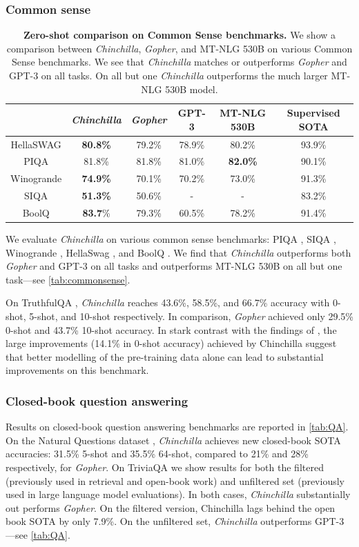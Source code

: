 \documentclass[11pt, a4paper, logo, copyright, nonumbering]{deepmind}
\newcommand{\gopher}{\textit{Gopher}\xspace}
\newcommand{\chinchilla}{\textit{Chinchilla}\xspace}
\newcommand{\mtnlg}{MT-NLG 530B\xspace}
\begin{document}
\subsubsection{Common sense}
\begin{table}[hb]
    \centering
    \begin{tabular}{cccccc}
    \toprule
    & \chinchilla & \gopher & GPT-3 & \mtnlg & Supervised SOTA \\
    \midrule
    HellaSWAG & \textbf{80.8\%} & 79.2\% & 78.9\% & 80.2\% & 93.9\% \\
    PIQA & 81.8\% & 81.8\% & 81.0\% & \textbf{82.0\%} & 90.1\% \\
    Winogrande & \textbf{74.9\%} & 70.1\% & 70.2\% & 73.0\% & 91.3\% \\
    SIQA & \textbf{51.3\%} & 50.6\% & - & - & 83.2\% \\
    BoolQ & \textbf{83.7}\% & 79.3\% & 60.5\% & 78.2\%& 91.4\% \\
    \bottomrule
    \end{tabular}
    \caption{\textbf{Zero-shot comparison on Common Sense benchmarks.} We show a comparison between \chinchilla, \gopher, and \mtnlg on various Common Sense benchmarks.
    We see that \chinchilla matches or outperforms \gopher and GPT-3 on all tasks. On all but one \chinchilla outperforms the much larger \mtnlg model.
    }
    \label{tab:commonsense}
\end{table}
We evaluate \chinchilla on various common sense benchmarks: PIQA \citep{piqa}, SIQA \citep{socialiqa}, Winogrande \citep{winogrande}, HellaSwag \citep{hellaswag}, and BoolQ \citep{clark2019boolq}.
We find that \chinchilla outperforms both \gopher and GPT-3 on all tasks and outperforms \mtnlg on all but one task---see \autoref{tab:commonsense}. 

On TruthfulQA \citep{truthfulqa}, \chinchilla reaches 43.6\%, 58.5\%, and 66.7\% accuracy with 0-shot, 5-shot, and 10-shot respectively. In comparison, \gopher achieved only 29.5\% 0-shot and 43.7\% 10-shot accuracy.
In stark contrast with the findings of \citet{truthfulqa}, the large improvements (14.1\% in 0-shot accuracy) achieved by Chinchilla suggest that better modelling of the pre-training data alone can lead to substantial improvements on this benchmark.

\subsubsection{Closed-book question answering}
Results on closed-book question answering benchmarks are reported in \autoref{tab:QA}.
On the Natural Questions dataset \citep{naturalquestions}, \chinchilla achieves new closed-book SOTA accuracies: 31.5\% 5-shot and 35.5\% 64-shot, compared to 21\% and 28\% respectively, for \gopher.
On TriviaQA \citep{triviaqa} we show results for both the filtered (previously used in retrieval and open-book work) and unfiltered set (previously used in large language model evaluations).
In both cases, \chinchilla substantially out performs \gopher.
On the filtered version, Chinchilla lags behind the open book SOTA \citep{izacard2020distilling} by only 7.9\%.
On the unfiltered set, \chinchilla outperforms GPT-3---see \autoref{tab:QA}.
\end{document}
